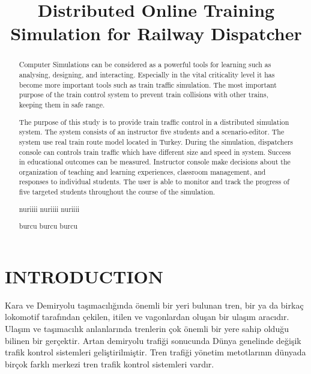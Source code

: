 \documentclass[conference]{IEEEtran}
\begin{document}
\title{Distributed Online Training Simulation for Railway Dispatcher }



\author{


}

\maketitle

\begin{abstract}
Computer Simulations can be considered as a powerful tools for learning such as analysing, designing, and interacting. Especially in the vital criticality level it has become more important tools such as train traffic simulation.
The most important purpose of the train control system to prevent train collisions with other trains, keeping them in safe range.

The purpose of this study is to provide train traffic control in a distributed simulation system. The system consists of an instructor five students and a scenario-editor. The system use real train route model located in Turkey.  During the simulation, dispatchers console can controls train traffic which have different  size and speed in system. Success in educational outcomes can be measured. Instructor console make decisions about the organization of teaching and learning 
experiences, classroom management, and responses to 
individual students. The user is able to monitor and track the progress of five targeted students throughout the course of the simulation.

nuriiii nuriiii nuriiii

burcu burcu burcu
\end{abstract}

\section{INTRODUCTION}
Kara ve Demiryolu taşımacılığında önemli bir yeri bulunan tren, bir ya da birkaç lokomotif tarafından çekilen, itilen ve vagonlardan oluşan bir ulaşım aracıdır. Ulaşım ve taşımacılık anlanlarında trenlerin çok önemli bir yere sahip olduğu bilinen bir gerçektir. 
Artan demiryolu trafiği sonucunda Dünya genelinde değişik trafik kontrol sistemleri geliştirilmiştir. Tren trafiği yönetim metotlarının dünyada birçok farklı merkezi tren trafik kontrol sistemleri vardır.
\end{document}
